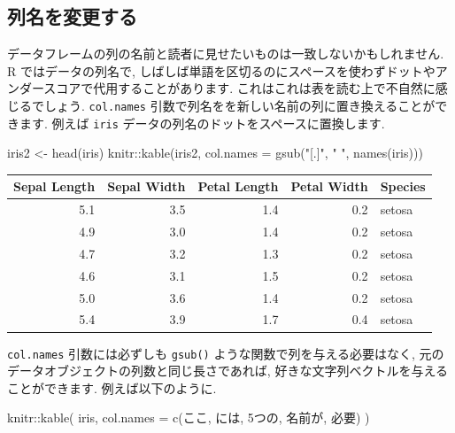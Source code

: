\documentclass[
  11pt,
]{bxjsreport}
\newenvironment{Shaded}{\begin{snugshade}}{\end{snugshade}}
\newcommand{\AttributeTok}[1]{\textcolor[rgb]{0.77,0.63,0.00}{#1}}
\newcommand{\FunctionTok}[1]{\textcolor[rgb]{0.00,0.00,0.00}{#1}}
\newcommand{\NormalTok}[1]{#1}
\newcommand{\OtherTok}[1]{\textcolor[rgb]{0.56,0.35,0.01}{#1}}
\newcommand{\SpecialCharTok}[1]{\textcolor[rgb]{0.00,0.00,0.00}{#1}}
\newcommand{\StringTok}[1]{\textcolor[rgb]{0.31,0.60,0.02}{#1}}
\begin{document}
\hypertarget{change-column-names}{%
\subsection{列名を変更する}\label{change-column-names}}

データフレームの列の名前と読者に見せたいものは一致しないかもしれません. R ではデータの列名で, しばしば単語を区切るのにスペースを使わずドットやアンダースコアで代用することがあります. これはこれは表を読む上で不自然に感じるでしょう. \texttt{col.names} 引数で列名をを新しい名前の列に置き換えることができます. 例えば \texttt{iris} データの列名のドットをスペースに置換します.

\begin{Shaded}
\begin{Highlighting}[numbers=left,,]
\NormalTok{iris2 }\OtherTok{\textless{}{-}} \FunctionTok{head}\NormalTok{(iris)}
\NormalTok{knitr}\SpecialCharTok{::}\FunctionTok{kable}\NormalTok{(iris2, }\AttributeTok{col.names =} \FunctionTok{gsub}\NormalTok{(}\StringTok{"[.]"}\NormalTok{, }\StringTok{" "}\NormalTok{, }\FunctionTok{names}\NormalTok{(iris)))}
\end{Highlighting}
\end{Shaded}

\begin{tabular}{r|r|r|r|l}
\hline
Sepal Length & Sepal Width & Petal Length & Petal Width & Species\\
\hline
5.1 & 3.5 & 1.4 & 0.2 & setosa\\
\hline
4.9 & 3.0 & 1.4 & 0.2 & setosa\\
\hline
4.7 & 3.2 & 1.3 & 0.2 & setosa\\
\hline
4.6 & 3.1 & 1.5 & 0.2 & setosa\\
\hline
5.0 & 3.6 & 1.4 & 0.2 & setosa\\
\hline
5.4 & 3.9 & 1.7 & 0.4 & setosa\\
\hline
\end{tabular}

\texttt{col.names} 引数には必ずしも \texttt{gsub()} ような関数で列を与える必要はなく, 元のデータオブジェクトの列数と同じ長さであれば, 好きな文字列ベクトルを与えることができます. 例えば以下のように.

\begin{Shaded}
\begin{Highlighting}[numbers=left,,]
\NormalTok{knitr}\SpecialCharTok{::}\FunctionTok{kable}\NormalTok{(}
\NormalTok{  iris,}
  \AttributeTok{col.names =} \FunctionTok{c}\NormalTok{(}\StringTok{\textquotesingle{}ここ\textquotesingle{}}\NormalTok{, }\StringTok{\textquotesingle{}には\textquotesingle{}}\NormalTok{, }\StringTok{\textquotesingle{}5つの\textquotesingle{}}\NormalTok{, }\StringTok{\textquotesingle{}名前が\textquotesingle{}}\NormalTok{, }\StringTok{\textquotesingle{}必要\textquotesingle{}}\NormalTok{)}
\NormalTok{)}
\end{Highlighting}
\end{Shaded}
\end{document}
